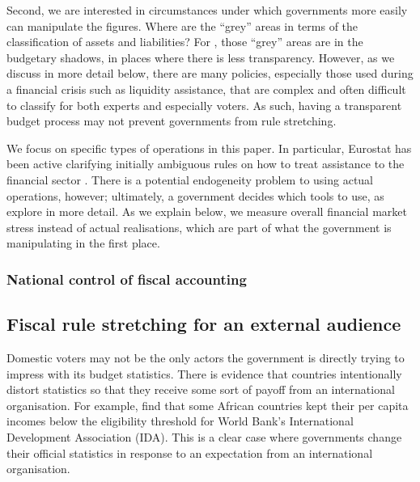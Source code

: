\documentclass[]{article}
\begin{document}
Second, we are interested in circumstances under which governments more easily can manipulate the figures. Where are the ``grey'' areas in terms of the classification of assets and liabilities? For \cite{Alt2014}, those ``grey'' areas are in the budgetary shadows, in places where there is less transparency. However, as we discuss in more detail below, there are many policies, especially those used during a financial crisis such as liquidity assistance, that are complex and often difficult to classify for both experts and especially voters. As such, having a transparent budget process may not prevent governments from rule stretching.

We focus on specific types of operations in this paper. In particular, Eurostat has been active clarifying initially ambiguous rules on how to treat assistance to the financial sector \cite[see][]{GandrudHallerberg2016}. There is a potential endogeneity problem to using actual operations, however; ultimately, a government decides which tools to use, as \cite{GandrudHallerberg2016} explore in more detail. As we explain below, we measure overall financial market stress instead of actual realisations, which are part of what the government is manipulating in the first place.

\subsubsection{National control of fiscal accounting}

\subsection{Fiscal rule stretching for an external audience}

Domestic voters may not be the only actors the government is directly trying to impress with its budget statistics. There is evidence that countries intentionally distort statistics so that they receive some sort of payoff from an international organisation. For example, \cite{kerner2016} find that some African countries kept their per capita incomes below the eligibility threshold for World Bank’s International Development Association (IDA). This is a clear case where governments change their official statistics in response to an expectation from an international organisation.
\end{document}

